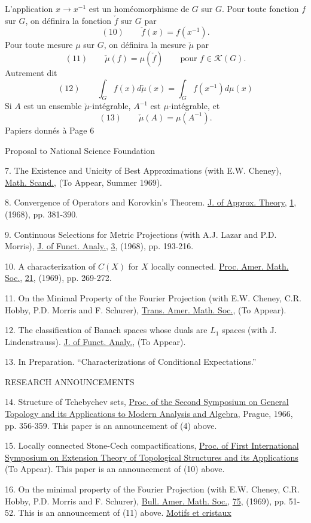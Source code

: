 L'application $x\longrightarrow x^{-1}$ est un homéomorphisme de $G$ sur $G$. Pour toute fonction $f$ sur $G$, on définira la fonction $\check f$ sur $G$ par
\[
(10)\qquad\check f(x)=f(x^{-1}).
\]
Pour toute mesure $\mu$ sur $G$, on définira la mesure $\check\mu$ par
\[
(11)\qquad\check\mu(f)=\mu(\check f)\qquad\text{pour }f\in\mathcal K(G).
\]
Autrement dit
\[
(12)\qquad\int_G f(x)d\check\mu(x)=\int_G f(x^{-1})d\mu(x)
\]
Si $A$ est un ensemble $\check\mu$-intégrable, $A^{-1}$ est $\mu$-intégrable, et
\[
(13)\qquad\check\mu(A)=\mu(A^{-1}).
\]
Papiers donnés à 
Page 6

Proposal to National Science Foundation

7. The Existence and Unicity of Best Approximations (with E.W. Cheney), \uline{Math. Scand.}, (To Appear, Summer 1969).

8. Convergence of Operators and Korovkin's Theorem. \uline{J. of Approx. Theory}, \uline{1}, (1968), pp. 381-390.

9. Continuous Selections for Metric Projections (with A.J. Lazar and P.D. Morris), \uline{J. of Funct. Analy.}, \uline{3}, (1968), pp. 193-216.

10. A characterization of $C(X)$ for $X$ locally connected. \uline{Proc. Amer. Math. Soc.}, \uline{21}, (1969), pp. 269-272.

11. On the Minimal Property of the Fourier Projection (with E.W. Cheney, C.R. Hobby, P.D. Morris and F. Schurer), \uline{Trans. Amer. Math. Soc.}, (To Appear).

12. The classification of Banach spaces whose duals are $L_1$ spaces (with J. Lindenstrauss). \uline{J. of Funct. Analy.}, (To Appear).

13. In Preparation. ``Characterizations of Conditional Expectations.''

RESEARCH ANNOUNCEMENTS

14. Structure of Tchebychev sets, \uline{Proc. of the Second Symposium on General Topology and its Applications to Modern Analysis and Algebra}, Prague, 1966, pp. 356-359. This paper is an announcement of (4) above.

15. Locally connected Stone-Cech compactifications, \uline{Proc. of First International Symposium on Extension Theory of Topological Structures and its Applications} (To Appear). This paper is an announcement of (10) above.

16. On the minimal property of the Fourier Projection (with E.W. Cheney, C.R. Hobby, P.D. Morris and F. Schurer), \uline{Bull. Amer. Math. Soc.}, \uline{75}, (1969), pp. 51-52. This is an announcement of (11) above.
\uline{Motifs et cristaux}

